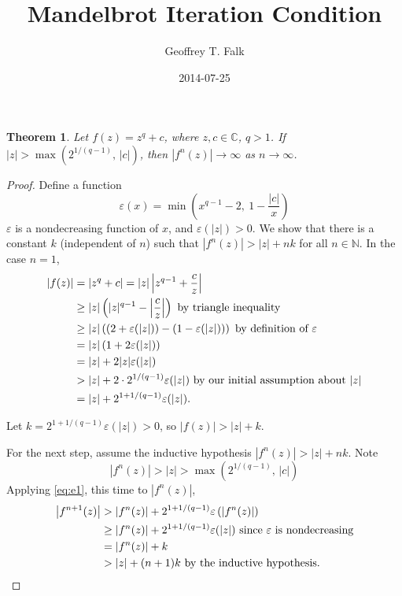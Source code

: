 \documentclass[11pt]{article}
\date{2014-07-25}
\author{Geoffrey T. Falk}
\title{Mandelbrot Iteration Condition}
\begin{document}

\maketitle

\newtheorem*{theorem}{Theorem}

\begin{theorem}
Let \( f(z) = z^q + c \), where \( z, c \in \mathbb{C} \), \( q > 1 \).
If \( |z| > \max\left(2^{1/(q-1)},\, |c|\right) \), then
\( |f^n(z)| \rightarrow \infty \) as \( n \rightarrow \infty \).
\end{theorem}

\begin{proof}
Define a function
\[
\varepsilon(x) = \min\left(x^{q-1} - 2,\ 1 - \frac{|c|}{x}\right)
\]
\( \varepsilon \) is a nondecreasing function of \( x \), and \( \varepsilon(|z|) > 0 \).
We show that there is a constant \( k \) (independent of \( n \)) such that
\( |f^n(z)| > |z| + n k \) for all \( n \in \mathbb{N} \). In the case \( n = 1 \),
\begin{equation} \label{eq:e1}
\begin{aligned}
|f(z)| &= \left| z^q + c \right| = |z| \left| z^{q-1} + \frac{c}{z} \right| \\
&\geq |z| \left( |z|^{q-1} - {\left|\frac{c}{z}\right|} \right) \text{ by triangle inequality} \\
&\geq |z| \left( \left(2 + \varepsilon(|z|) \right) - \left(1 - \varepsilon(|z|)\right) \right)
 \text{ by definition of \( \varepsilon \)} \\
&= |z| \left(1 + 2 \varepsilon(|z|) \right) \\
&= |z| + 2 |z| \varepsilon(|z|) \\
&> |z| + 2 \cdot 2^{{1/(q-1)}} \varepsilon(|z|) \text{ by our initial assumption about } |z| \\
&= |z| + 2^{1 + {1/(q-1)}} \varepsilon(|z|).
\end{aligned}
\end{equation}

Let \( k = 2^{1 + {1/(q-1)}} \varepsilon(|z|) > 0 \), so \( |f(z)| > |z| + k \).
\parskip 6pt

For the next step, assume the inductive hypothesis \( |f^n(z)| > |z| + n k \).
Note
\[
|f^n(z)| > |z| > \max\left(2^{1/(q-1)},\, |c|\right)
\]
Applying \eqref{eq:e1}, this time to \( |f^n(z)| \),
\begin{equation} \label{eq:e2}
\begin{aligned}
\left|f^{n+1}(z)\right| 
&> \left|f^n(z)\right| +  2^{1 + {1/(q-1)}} \varepsilon\left( \left|f^n(z)\right| \right) \\
&\geq \left|f^n(z)\right| + 2^{1 + {1/(q-1)}} \varepsilon(|z|) \text{ since \( \varepsilon \) is nondecreasing} \\
&= \left|f^n(z)\right| + k \\
&> |z| + (n+1)k \text{ by the inductive hypothesis.}
\end{aligned}
\end{equation}
\end{proof}
\end{document}
